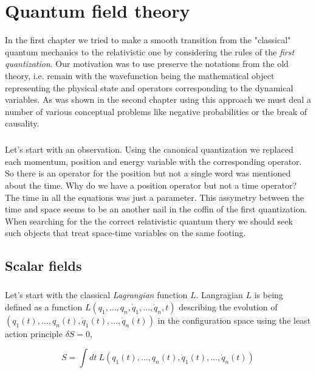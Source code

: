 \chapter{Quantum field theory}

In the first chapter we tried to make a smooth transition from the "classical" quantum mechanics
to the relativistic one by considering the rules of the \textit{first quantization}. Our motivation
was to use preserve the notations from the old theory, i.e. remain with the wavefunction being the
mathematical object representing the physical state and operators corresponding to the dynamical 
variables. As was shown in the second chapter using this approach we must deal a number of
various conceptual problems like negative probabilities or the break of causality. 

\paragraph{} Let's start with an observation. Using the canonical quantization we replaced each momentum, position
and energy variable with the corresponding operator. So there is an operator for the position
but not a single word was mentioned about the time. Why do we have a position operator but not a
time operator? The time in all the equations was just a parameter. This assymetry between the time
and space seems to be an another nail in the coffin of the first quantization. When searching for
the the correct relativistic quantum thery we should seek such objects that treat space-time variables
on the same footing. 

\section{Scalar fields}

\paragraph{} Let's start with the classical \textit{Lagrangian} function $L$. Langragian $L$ is being defined as a 
function $L(q_{1}, \dots, q_{n}, \dot{q}_{1}, \dots, \dot{q}_{n}, t)$ describing the evolution of 
$(q_{1}(t), \dots, q_{n}(t), \dot{q}_{1}(t), \dots, \dot{q}_{n}(t))$ in the configuration space using the least action 
principle $\delta S = 0$,

\begin{equation}
    \label{eq:action}
    S = \int dt \ L(q_{1}(t), \dots, q_{n}(t), \dot{q}_{1}(t), \dots, \dot{q}_{n}(t))
\end{equation}

